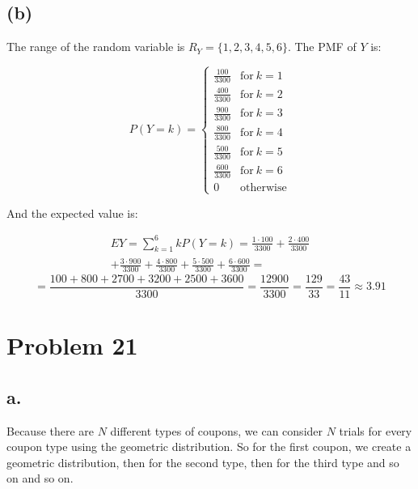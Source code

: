 \documentclass{article}
\begin{document}
\subsection*{(b)}

The range of the random variable is \(R_{Y} = \{1, 2, 3, 4, 5, 6\}\). The PMF of \(Y\) is:

\begin{equation*}
    P(Y = k) =
    \begin{cases}
        \frac{100}{3300} & \mbox{for} \ k = 1 \\
        \frac{400}{3300} & \mbox{for} \ k = 2 \\
        \frac{900}{3300} & \mbox{for} \ k = 3 \\
        \frac{800}{3300} & \mbox{for} \ k = 4 \\
        \frac{500}{3300} & \mbox{for} \ k = 5 \\
        \frac{600}{3300} & \mbox{for} \ k = 6 \\
        0 & \mbox{otherwise} 
    \end{cases}
\end{equation*}

And the expected value is:

\begin{multline*}
    EY = \sum_{k=1}^{6} kP(Y=k) = \frac{1 \cdot 100}{3300} + \frac{2 \cdot 400}{3300}  \\ 
    + \frac{3 \cdot 900}{3300} + \frac{4 \cdot 800}{3300} + \frac{5 \cdot 500}{3300} + \frac{6 \cdot 600}{3300} =
\end{multline*}
\begin{equation*}
    = \frac{100 + 800 + 2700 + 3200 + 2500 + 3600}{3300} = \frac{12900}{3300} = \frac{129}{33} = \frac{43}{11} \approx 3.91 
\end{equation*}



\section*{Problem 21}

\subsection*{a.}


Because there are \(N\) different types of coupons, we can consider \(N\) trials for every
coupon type using the geometric distribution. So for the first coupon, we create a geometric
distribution, then for the second type, then for the third type and so on and so on.
\end{document}
